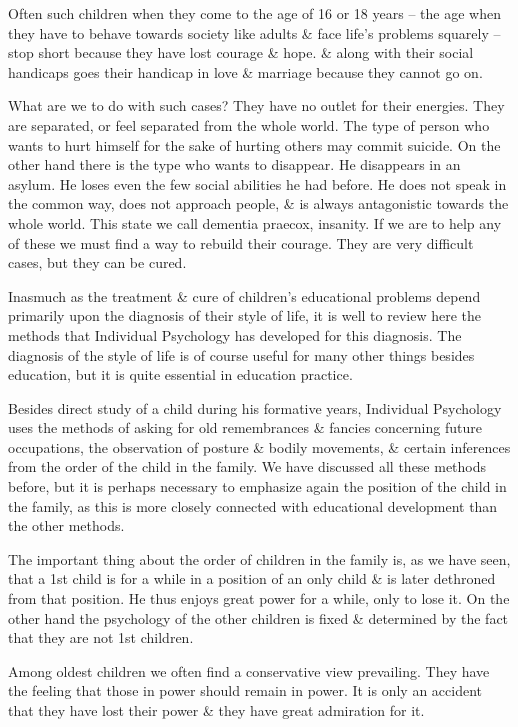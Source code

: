 \documentclass{article}
\numberwithin{equation}{section}
\begin{document}
Often such children when they come to the age of 16 or 18 years -- the age when they have to behave towards society like adults \& face life's problems squarely -- stop short because they have lost courage \& hope. \& along with their social handicaps goes their handicap in love \& marriage because they cannot go on.

What are we to do with such cases? They have no outlet for their energies. They are separated, or feel separated from the whole world. The type of person who wants to hurt himself for the sake of hurting others may commit suicide. On the other hand there is the type who wants to disappear. He disappears in an asylum. He loses even the few social abilities he had before. He does not speak in the common way, does not approach people, \& is always antagonistic towards the whole world. This state we call dementia praecox, insanity. If we are to help any of these we must find a way to rebuild their courage. They are very difficult cases, but they can be cured.

Inasmuch as the treatment \& cure of children's educational problems depend primarily upon the diagnosis of their style of life, it is well to review here the methods that Individual Psychology has developed for this diagnosis. The diagnosis of the style of life is of course useful for many other things besides education, but it is quite essential in education practice.

Besides direct study of a child during his formative years, Individual Psychology uses the methods of asking for old remembrances \& fancies concerning future occupations, the observation of posture \& bodily movements, \& certain inferences from the order of the child in the family. We have discussed all these methods before, but it is perhaps necessary to emphasize again the position of the child in the family, as this is more closely connected with educational development than the other methods.

The important thing about the order of children in the family is, as we have seen, that a 1st child is for a while in a position of an only child \& is later dethroned from that position. He thus enjoys great power for a while, only to lose it. On the other hand the psychology of the other children is fixed \& determined by the fact that they are not 1st children.

Among oldest children we often find a conservative view prevailing. They have the feeling that those in power should remain in power. It is only an accident that they have lost their power \& they have great admiration for it.
\end{document}
